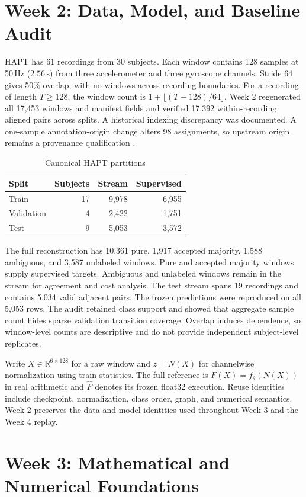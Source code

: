 \documentclass[journal]{IEEEtran}
\newcommand{\R}{\mathbb R}
\begin{document}
\section{Week 2: Data, Model, and Baseline Audit}
HAPT has 61 recordings from 30 subjects. Each window contains 128 samples at 50\,Hz ($2.56$\,s) from three accelerometer and three gyroscope channels. Stride 64 gives 50\% overlap, with no windows across recording boundaries. For a recording of length $T\ge128$, the window count is $1+\lfloor(T-128)/64\rfloor$. Week 2 regenerated all 17,453 windows and manifest fields and verified 17,392 within-recording aligned pairs across splits. A historical indexing discrepancy was documented. A one-sample annotation-origin change alters 98 assignments, so upstream origin remains a provenance qualification \cite{localweek2}.
\begin{table}[t]
\caption{Canonical HAPT partitions}
\centering
\begin{tabular}{lrrr}\toprule
Split & Subjects & Stream & Supervised\\\midrule
Train & 17 & 9,978 & 6,955\\
Validation & 4 & 2,422 & 1,751\\
Test & 9 & 5,053 & 3,572\\\bottomrule
\end{tabular}
\end{table}
The full reconstruction has 10,361 pure, 1,917 accepted majority, 1,588 ambiguous, and 3,587 unlabeled windows. Pure and accepted majority windows supply supervised targets. Ambiguous and unlabeled windows remain in the stream for agreement and cost analysis. The test stream spans 19 recordings and contains 5,034 valid adjacent pairs. The frozen predictions were reproduced on all 5,053 rows. The audit retained class support and showed that aggregate sample count hides sparse validation transition coverage. Overlap induces dependence, so window-level counts are descriptive and do not provide independent subject-level replicates.
\par
Write $X\in\R^{6\times128}$ for a raw window and $z=N(X)$ for channelwise normalization using train statistics. The full reference is $F(X)=f_\theta(N(X))$ in real arithmetic and $\widehat F$ denotes its frozen float32 execution. Reuse identities include checkpoint, normalization, class order, graph, and numerical semantics. Week 2 preserves the data and model identities used throughout Week 3 and the Week 4 replay.
\section{Week 3: Mathematical and Numerical Foundations}
\end{document}
